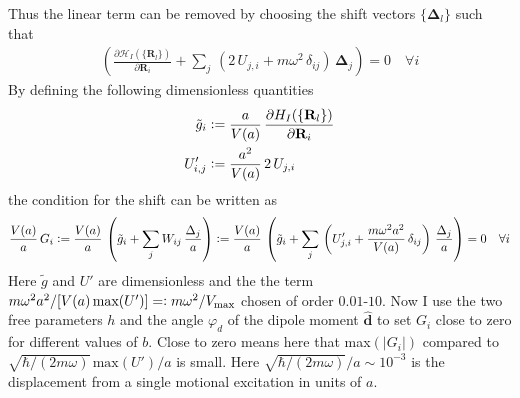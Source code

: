Thus the linear term can be removed by choosing the shift vectors $\{\mathbf{\Delta}_l\}$ such that
\begin{align*}
    \left(\frac{\partial \mathcal{H}_I(\{\mathbf{R}_l\})}{\partial \mathbf{R}_i} +\sum_j\,\left( 2\, U_{j,i} + m\omega^2\,\delta_{ij}\right)\,\mathbf{\Delta}_j  \right)= 0 \quad\forall i
\end{align*}
By defining the following dimensionless quantities
\begin{align*}
    \tilde{g}_i&\vcentcolon=\frac{a}{V(a)}\,\frac{\partial H_I(\{\mathbf{R}_l\})}{\partial \mathbf{R}_i}\\
    {U}_{i,j}'&\vcentcolon=\frac{a^2}{V(a)}\, 2\, U_{j,i} 
\end{align*}
the condition for the shift can be written as
\begin{align*}
     \frac{V(a)}{a}\,G_i\vcentcolon=\frac{V(a)}{a}\,\left(\tilde{g}_i +\sum_jW_{ij}\,\frac{{\Delta}_j}{a}  \right)\vcentcolon=\frac{V(a)}{a}\,\left(\tilde{g}_i +\sum_j\,\left( {U}_{j,i}' + \frac{m\omega^2 a^2}{V(a)}\,\delta_{ij}\right)\,\frac{{\Delta}_j}{a}  \right)= 0 \quad\forall i
\end{align*}
Here $\tilde{g}$ and ${U}'$ are dimensionless and the the term $m\omega^2 a^2/[V(a)\,\text{max}(U')]=\vcentcolon m\omega^2/V_\text{max}$ chosen of order $0.01$-$10$. Now I use the two free parameters $h$ and the angle $\varphi_d$ of the dipole moment $\hat{\mathbf{d}}$ to set $G_i$ close to zero for different values of $b$. Close to zero means here that max$(|G_i|)$ compared to $\sqrt{\hbar/(2m\omega)}\,\text{max}(U')/a$ is small. Here $\sqrt{\hbar/(2m\omega)}/a\sim10^{-3}$ is the displacement from a single motional excitation in units of $a$.
